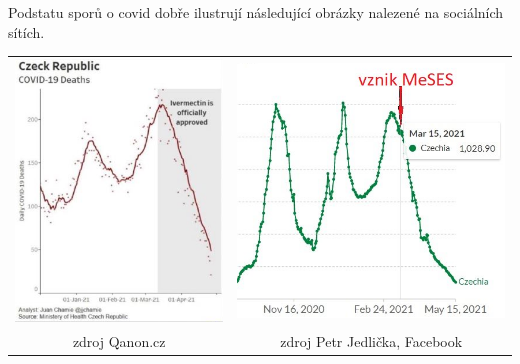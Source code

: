 Podstatu sporů o covid dobře ilustrují následující obrázky nalezené na sociálních sítích. 
\begin{center}
\begin{tabular}{cc}
\includegraphics{pic/ivermectine.png} & \includegraphics{pic/meses.png}\tabularnewline
{\small zdroj Qanon.cz} &  \small {zdroj Petr Jedlička, Facebook} \tabularnewline
\end{tabular}
\end{center}

